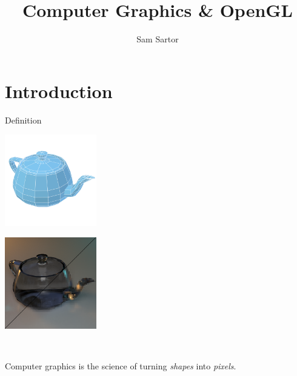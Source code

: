 \documentclass{lug}
\title{Computer Graphics \& OpenGL}
\author{Sam Sartor}
\institute{Mines Linux Users Group}
\newcommand{\pmidg}[1]{\parbox{\widthof{#1}}{#1}}
\begin{document}
\section{Introduction}

\begin{frame}{Definition}
\begin{center}
    \pmidg{\includegraphics[width=4cm]{graphics/teapot_mesh}} \scalebox{2}{$\rightarrow$} \pmidg{\includegraphics[width=4cm]{graphics/teapot_rt_pix}} \\
    
    \bigskip

    Computer graphics is the science of turning \textit{shapes} into \textit{pixels}.
\end{center}
\end{frame}
\end{document}
